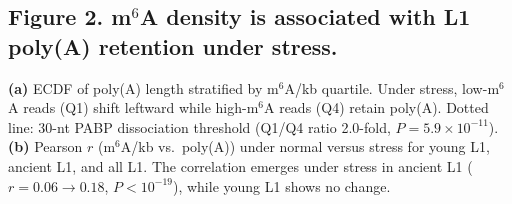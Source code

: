 \documentclass[11pt]{article}
\newcommand{\msix}{m$^6$A}
\begin{document}
\subsection*{Figure 2. \msix{} density is associated with L1 poly(A) retention under stress.}
\textbf{(a)} ECDF of poly(A) length stratified by \msix{}/kb quartile.
Under stress, low-\msix{} reads (Q1) shift leftward while high-\msix{}
reads (Q4) retain poly(A). Dotted line: 30-nt PABP dissociation
threshold (Q1/Q4 ratio 2.0-fold, $P = 5.9 \times 10^{-11}$).
%
\textbf{(b)} Pearson $r$ (\msix{}/kb vs.\ poly(A)) under normal versus
stress for young L1, ancient L1, and all L1. The correlation emerges
under stress in ancient L1 ($r = 0.06 \to 0.18$, $P < 10^{-19}$),
while young L1 shows no change.
\end{document}
